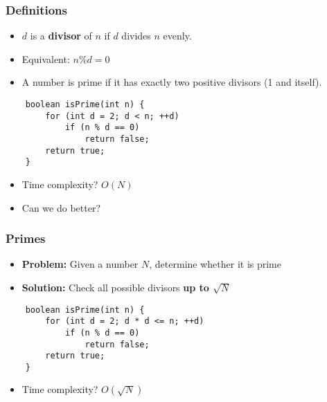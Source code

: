 \documentclass[t, handout]{beamer}
\begin{document}
\begin{frame}[fragile]
    \frametitle{Definitions}
    
    \begin{itemize}
        \item $d$ is a \textbf{divisor} of $n$ if $d$ divides $n$ evenly.
        \pause
        \item Equivalent: $n \% d = 0$

        \item A number is prime if it has exactly two positive divisors (1 and itself).
    \end{itemize}
    
    \begin{verbatim}
    boolean isPrime(int n) {
        for (int d = 2; d < n; ++d)
            if (n % d == 0)
                return false;
        return true;
    }
    \end{verbatim}
    
    \pause
    \begin{itemize}
        \item Time complexity? \pause $O(N)$
        \pause
        \item Can we do better?
    \end{itemize}
    
\end{frame}

\begin{frame}[fragile]

    \frametitle{Primes}
    
    \begin{itemize}
        \item \textbf{Problem:} Given a number $N$, determine whether it is prime
        \item \textbf{Solution:} Check all possible divisors \textbf{up to $\sqrt{N}$}
    \end{itemize}
    
    \begin{verbatim}
    boolean isPrime(int n) {
        for (int d = 2; d * d <= n; ++d)
            if (n % d == 0)
                return false;
        return true;
    }
    \end{verbatim}
    
    \pause
    \begin{itemize}
        \item Time complexity? \pause $O(\sqrt{N})$
    \end{itemize}
    
\end{frame}
\end{document}
